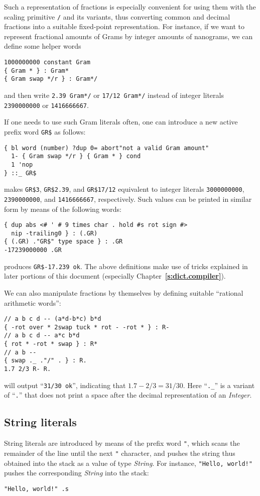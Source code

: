 \documentclass[12pt,oneside]{article}
\def\refpoint#1{{\rm\textbf{\ref{#1}}}}
\let\ptref=\refpoint
\def\mysubsection#1{\subsection{#1}\fancyhead[C]{\small{\textsc{\textrm{\thesubsection.} #1}}}}
\begin{document}
Such a representation of fractions is especially convenient for using them with the scaling primitive {\tt */} and its variants, thus converting common and decimal fractions into a suitable fixed-point representation. For instance, if we want to represent fractional amounts of Grams by integer amounts of nanograms, we can define some helper words
\begin{verbatim}
1000000000 constant Gram
{ Gram * } : Gram*
{ Gram swap */r } : Gram*/
\end{verbatim}
and then write {\tt 2.39 Gram*/} or {\tt 17/12 Gram*/} instead of integer literals {\tt 2390000000} or {\tt 1416666667}.

If one needs to use such Gram literals often, one can introduce a new active prefix word {\tt GR\$} as follows:
\begin{verbatim}
{ bl word (number) ?dup 0= abort"not a valid Gram amount" 
  1- { Gram swap */r } { Gram * } cond 
  1 'nop
} ::_ GR$
\end{verbatim}
makes {\tt GR\$3}, {\tt GR\$2.39}, and {\tt GR\$17/12} equivalent to integer literals {\tt 3000000000}, {\tt 2390000000}, and {\tt 1416666667}, respectively. Such values can be printed in similar form by means of the following words:
\begin{verbatim}
{ dup abs <# ' # 9 times char . hold #s rot sign #>
  nip -trailing0 } : (.GR)
{ (.GR) ."GR$" type space } : .GR
-17239000000 .GR
\end{verbatim}
produces {\tt GR\$-17.239 ok}. The above definitions make use of tricks explained in later portions of this document (especially Chapter~\ptref{s:dict.compiler}).

We can also manipulate fractions by themselves by defining suitable ``rational arithmetic words'':
\begin{verbatim}
// a b c d -- (a*d-b*c) b*d
{ -rot over * 2swap tuck * rot - -rot * } : R-
// a b c d -- a*c b*d
{ rot * -rot * swap } : R*
// a b --
{ swap ._ ."/" . } : R.
1.7 2/3 R- R.
\end{verbatim}
will output ``{\tt 31/30 ok}'', indicating that $1.7-2/3=31/30$. Here ``{\tt .\_}'' is a variant of ``{\tt .}'' that does not print a space after the decimal representation of an {\em Integer}.

\mysubsection{String literals}\label{p:string.lit}
String literals are introduced by means of the prefix word {\tt "}, which scans the remainder of the line until the next {\tt "} character, and pushes the string thus obtained into the stack as a value of type {\em String}. For instance, {\tt "Hello, world!"} pushes the corresponding {\em String\/} into the stack:
\begin{verbatim}
"Hello, world!" .s
\end{verbatim}
\end{document}
